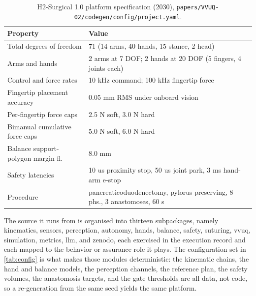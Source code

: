 \begin{table}[H]
\caption{H2-Surgical 1.0 platform specification (2030),
\texttt{papers/VVUQ-02/codegen/config/project.yaml}.}
\label{tab:platform}
\centering
\footnotesize
\begin{tabularx}{\textwidth}{L{5.2cm} Y}
\toprule
\textbf{Property} & \textbf{Value} \\
\midrule
Total degrees of freedom & 71 (14 arms, 40 hands, 15 stance, 2 head) \\
Arms and hands & 2 arms at 7 DOF; 2 hands at 20 DOF (5 fingers, 4 joints each) \\
Control and force rates & 10 kHz command; 100 kHz fingertip force \\
Fingertip placement accuracy & 0.05 mm RMS under onboard vision \\
Per-fingertip force caps & 2.5 N soft, 3.0 N hard \\
Bimanual cumulative force caps & 5.0 N soft, 6.0 N hard \\
Balance support-polygon margin fl. & 8.0 mm \\
Safety latencies & 10 us proximity stop, 50 us joint park, 3 ms hand-arm e-stop \\
Procedure & pancreaticoduodenectomy, pylorus preserving, 8 phs., 3 anastomoses, 60 s \\
\bottomrule
\end{tabularx}
\end{table}

The source it runs from is organised into thirteen subpackages, namely
kinematics, sensors, perception, autonomy, hands, balance, safety, suturing,
vvuq, simulation, metrics, llm, and zenodo, each exercised in the execution
record and each mapped to the behavior or assurance role it plays. The
configuration set in \autoref{tab:config} is what makes those modules
deterministic: the kinematic chains, the hand and balance models, the perception
channels, the reference plan, the safety volumes, the anastomosis targets, and
the gate thresholds are all data, not code, so a re-generation from the same seed
yields the same platform.

